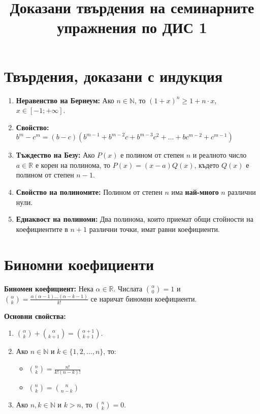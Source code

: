 \documentclass[11pt,oneside,a4paper]{article}
\begin{document}
\title{Доказани твърдения на семинарните упражнения по ДИС 1}
\date{}
\maketitle
\vspace{-4em} 

\section*{Твърдения, доказани с индукция}

\begin{enumerate}
    \item \textbf{Неравенство  на Бернеум:}  
    Ако \(n \in \mathbb{N} \), то \((1 + x)^n \geq 1 + n \cdot x\), \(x \in [-1; +\infty]\).
    \item \textbf{Свойство:} 
    \(b^m - c^m = (b - c)(b^{m-1} + b^{m-2}c + b^{m-3}c^2 + \dots + bc^{m-2} + c^{m-1})\)
    \item \textbf{Тъждество на Безу:}  
    Ако \(P(x)\) е полином от степен \(n\) и реалното число \(a \in \mathbb{R}\) е корен на полинома, то \(P(x) = (x-a)Q(x)\), където \(Q(x)\) е полином от степен \(n-1\).
    \item \textbf{Свойство на полиномите:}  
    Полином от степен \(n\) има \textbf{най-много} \(n\) различни нули.
    \item \textbf{Еднаквост на полиноми:}  
    Два полинома, които приемат общи стойности на коефициентите в \(n+1\) различни точки, имат равни коефициенти.
\end{enumerate}

\section*{Биномни коефициенти}

\textbf{Биномен коефициент:}  
Нека \(\alpha \in \mathbb{R}\). Числата \(\binom{\alpha}{0} = 1\) и \(\binom{\alpha}{k} = \frac{\alpha(\alpha - 1)\dots(\alpha - k - 1)}{k!}\) се наричат биномни коефициенти.

\textbf{Основни свойства:} \vspace{-\baselineskip}
\begin{enumerate}[label=\textbf{(\alph*)}]
    \item \(\binom{\alpha}{k} + \binom{\alpha}{k+1} = \binom{\alpha + 1}{k + 1}\).
    \item Ако \(n \in \mathbb{N}\) и \(k \in \{1, 2, \dots, n\}\), то:
    \begin{itemize}
        \item \(\binom{n}{k} = \frac{n!}{k!(n-k)!}\)
        \item \(\binom{n}{k} = \binom{n}{n-k}\)
    \end{itemize}
    \item Ако \(n, k \in \mathbb{N}\) и \(k > n\), то \(\binom{n}{k} = 0\).
\end{enumerate}
\end{document}
